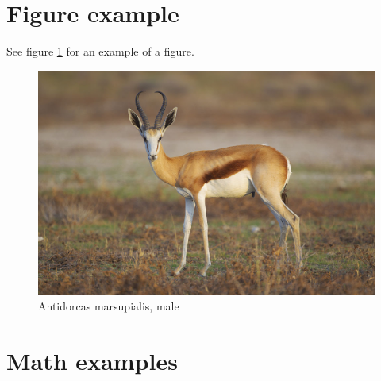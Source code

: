 \section{Figure example}

See figure \ref{figure\arabic{figurecounter}} for an example of a figure.

\begin{figure}
\includegraphics[width=\maxwidth{\textwidth}]{src/thesis/antidorcas.jpg}
\caption{Antidorcas marsupialis, male}
\label{figure\arabic{figurecounter}}
\end{figure}
\clearpage
\section{Math examples}

